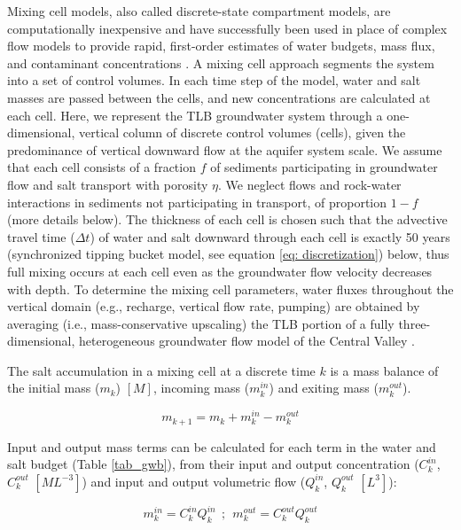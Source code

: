 Mixing cell models, also called discrete-state compartment models, are computationally inexpensive and have successfully been used in place of complex flow models to provide rapid, first-order estimates of water budgets, mass flux, and contaminant concentrations \citep{Campana1975, Campana1984, Campana1987, Carroll2008, Kirk1990}. A mixing cell approach segments the system into a set of control volumes. In each time step of the model, water and salt masses are passed between the cells, and new concentrations are calculated at each cell. Here, we represent the TLB groundwater system through a one-dimensional, vertical column of discrete control volumes (cells), given the predominance of vertical downward flow at the aquifer system scale. We assume that each cell consists of a fraction $f$ of sediments participating in groundwater flow and salt transport with porosity $\eta$. We neglect flows and rock-water interactions in sediments not participating in transport, of proportion $1-f$ (more details below). The thickness of each cell is chosen such that the advective travel time ($\Delta t$) of water and salt downward through each cell is exactly 50 years (synchronized tipping bucket model, see equation \ref{eq: discretization}) below, thus full mixing occurs at each cell even as the groundwater flow velocity decreases with depth. To determine the mixing cell parameters, water fluxes throughout the vertical domain (e.g., recharge, vertical flow rate, pumping) are obtained by averaging (i.e., mass-conservative upscaling) the TLB portion of a fully three-dimensional, heterogeneous groundwater flow model of the Central Valley \citep{Brush2013}.  

The salt accumulation in a mixing cell at a discrete time $k$ is a mass balance of the initial mass ($m_k$) $[M]$, incoming mass ($m_k^{in}$) and exiting mass ($m_k^{out}$).  

\begin{equation}
m_{k+1} = m_k + m_k^{in} - m_k^{out}
\label{eq: mass_balance}
\end{equation}  

Input and output mass terms can be calculated for each term in the water and salt budget (Table \ref{tab_gwb}), from their input and output concentration ($C_k^{in}$, $C_k^{out}$ $[ML^{-3}]$) and input and output volumetric flow ($Q_k^{in}$, $Q_k^{out}$ $[L^3]$):

\begin{equation}
m_k^{in} = C_k^{in} Q_k^{in}   \: \: ; \: \:  m_k^{out} = C_k^{out} Q_k^{out}
\label{eq: m_in_cell}
\end{equation}

